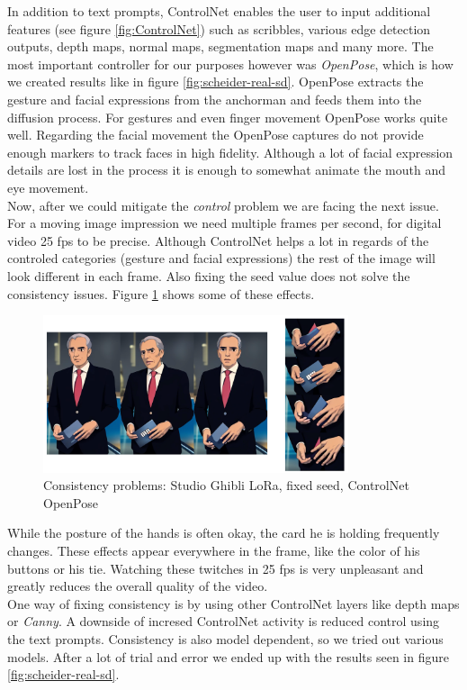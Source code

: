 \documentclass[
  a4paper,  %
  twoside,  %
  bibliography=totoc,
  headsepline,
  cleardoublepage=empty,
  parskip=half,
  draft=false
]{scrbook}
\begin{document}
In addition to text prompts, ControlNet enables the user to input additional features (see figure \ref{fig:ControlNet}) such as scribbles, various edge detection outputs, depth maps, normal maps, segmentation maps and many more. The most important controller for our purposes however was \textit{OpenPose}, which is how we created results like in figure \ref{fig:scheider-real-sd}. OpenPose extracts the gesture and facial expressions from the anchorman and feeds them into the diffusion process. For gestures and even finger movement OpenPose works quite well. Regarding the facial movement the OpenPose captures do not provide enough markers to track faces in high fidelity. Although a lot of facial expression details are lost in the process it is enough to somewhat animate the mouth and eye movement. \\
Now, after we could mitigate the \textit{control} problem we are facing the next issue. For a moving image impression we need multiple frames per second, for digital video 25 \gls{fps} to be precise. Although ControlNet helps a lot in regards of the controled categories (gesture and facial expressions) the rest of the image will look different in each frame. Also fixing the seed value does not solve the consistency issues. Figure \ref{fig:controlnet-issues} shows some of these effects.
\begin{figure}[h]
  \centering
  \includegraphics[width=0.8\textwidth]{./graphics/images/diffusion/ControlNet-issues.png}
  \caption{Consistency problems: Studio Ghibli LoRa, fixed seed, ControlNet OpenPose}
  \label{fig:controlnet-issues}
\end{figure}
While the posture of the hands is often okay, the card he is holding frequently changes. These effects appear everywhere in the frame, like the color of his buttons or his tie. Watching these twitches in 25 \gls{fps} is very unpleasant and greatly reduces the overall quality of the video. \\
One way of fixing consistency is by using other ControlNet layers like depth maps or \textit{Canny}. A downside of incresed ControlNet activity is reduced control using the text prompts. Consistency is also model dependent, so we tried out various models. After a lot of trial and error we ended up with the results seen in figure \ref{fig:scheider-real-sd}.
\end{document}
